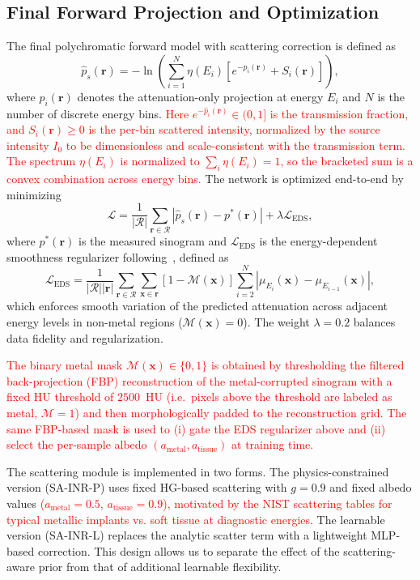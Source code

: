 \documentclass[journal]{IEEEtran}
\newcommand{\vx}{\mathbf{x}}
\newcommand{\vr}{\mathbf{r}}
\newcommand{\new}[1]{\textcolor{red}{#1}}  %
\def\ourmodel{SA-INR}
\begin{document}
\subsection{Final Forward Projection and Optimization}
The final polychromatic forward model with scattering correction is defined as
\begin{equation}\label{eq:final}
  \hat{p}_s(\vr)=-\ln\!\left(\sum_{i=1}^{N}\eta(E_i)\left[e^{-\hat{p}_i(\vr)}+S_i(\vr)\right]\right),
\end{equation}
where $\hat{p}_i(\vr)$ denotes the attenuation-only projection at energy $E_i$ and $N$ is the number of discrete energy bins. \new{Here $e^{-\hat{p}_i(\vr)}\in(0,1]$ is the transmission fraction, and $S_i(\vr) \geq 0$ is the per-bin scattered intensity, normalized by the source intensity $I_0$ to be dimensionless and scale-consistent with the transmission term. The spectrum $\eta(E_i)$ is normalized to $\sum_i \eta(E_i)=1$, so the bracketed sum is a convex combination across energy bins.}
The network is optimized end-to-end by minimizing
\begin{equation}\label{eq:loss}
  \mathcal{L}=\frac{1}{|\mathcal{R}|}\sum_{\vr\in\mathcal{R}}\left|\hat{p}_s(\vr)-p^*(\vr)\right|+\lambda\mathcal{L}_{\text{EDS}},
\end{equation}
where $p^*(\vr)$ is the measured sinogram and $\mathcal{L}_{\text{EDS}}$ is the energy-dependent smoothness regularizer following~\cite{wu2023unsupervised}, defined as
\begin{equation}\label{eq:eds}
\mathcal{L}_{\text{EDS}} = \frac{1}{|\mathcal{R}||\vr|}\sum_{\vr\in\mathcal{R}}\sum_{\vx\in\vr}[1-\mathcal{M}(\vx)]\sum_{i=2}^{N}\left|\mu_{E_i}(\vx)-\mu_{E_{i-1}}(\vx)\right|,
\end{equation}
which enforces smooth variation of the predicted attenuation across adjacent energy levels in non-metal regions ($\mathcal{M}(\vx){=}0$). The weight $\lambda{=}0.2$ balances data fidelity and regularization.

\new{The binary metal mask $\mathcal{M}(\vx)\in\{0,1\}$ is obtained by thresholding the filtered back-projection (FBP) reconstruction of the metal-corrupted sinogram with a fixed HU threshold of $2500$~HU (i.e.\ pixels above the threshold are labeled as metal, $\mathcal{M}=1$) and then morphologically padded to the reconstruction grid. The same FBP-based mask is used to (i) gate the EDS regularizer above and (ii) select the per-sample albedo $(a_{\text{metal}}, a_{\text{tissue}})$ at training time.}

The scattering module is implemented in two forms. The physics-constrained version (\ourmodel-P) uses fixed HG-based scattering with $g=0.9$ and fixed albedo values \new{($a_{\text{metal}}=0.5$, $a_{\text{tissue}}=0.9$), motivated by the NIST scattering tables for typical metallic implants vs. soft tissue at diagnostic energies}. The learnable version (\ourmodel-L) replaces the analytic scatter term with a lightweight MLP-based correction. This design allows us to separate the effect of the scattering-aware prior from that of additional learnable flexibility.
\end{document}
